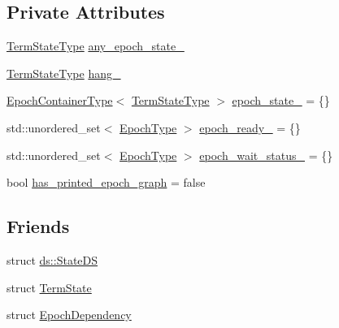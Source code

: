 \subsection*{Private Attributes}
\begin{DoxyCompactItemize}
\item 
\hyperlink{structvt_1_1term_1_1_term_action_ae4c635b69751d887666814700ed64d65}{Term\+State\+Type} \hyperlink{structvt_1_1term_1_1_termination_detector_a49337963d174e5be73fcf467304428a6}{any\+\_\+epoch\+\_\+state\+\_\+}
\item 
\hyperlink{structvt_1_1term_1_1_term_action_ae4c635b69751d887666814700ed64d65}{Term\+State\+Type} \hyperlink{structvt_1_1term_1_1_termination_detector_a5f873fb4a66c8364ec7859bbc608fe55}{hang\+\_\+}
\item 
\hyperlink{structvt_1_1term_1_1_termination_detector_a69e2615b61e072977463eea5b20b7933}{Epoch\+Container\+Type}$<$ \hyperlink{structvt_1_1term_1_1_term_action_ae4c635b69751d887666814700ed64d65}{Term\+State\+Type} $>$ \hyperlink{structvt_1_1term_1_1_termination_detector_a0c55ef5345253002f9de6e5c4337c53a}{epoch\+\_\+state\+\_\+} = \{\}
\item 
std\+::unordered\+\_\+set$<$ \hyperlink{namespacevt_a985a5adf291c34a3ca263b3378388236}{Epoch\+Type} $>$ \hyperlink{structvt_1_1term_1_1_termination_detector_a22c7c6cc9c6cd48b5570dbae226a56f3}{epoch\+\_\+ready\+\_\+} = \{\}
\item 
std\+::unordered\+\_\+set$<$ \hyperlink{namespacevt_a985a5adf291c34a3ca263b3378388236}{Epoch\+Type} $>$ \hyperlink{structvt_1_1term_1_1_termination_detector_a95cdb85a87fcf162725bc6515b43a002}{epoch\+\_\+wait\+\_\+status\+\_\+} = \{\}
\item 
bool \hyperlink{structvt_1_1term_1_1_termination_detector_a68afeac40869ccc50882f717106b382f}{has\+\_\+printed\+\_\+epoch\+\_\+graph} = false
\end{DoxyCompactItemize}
\subsection*{Friends}
\begin{DoxyCompactItemize}
\item 
struct \hyperlink{structvt_1_1term_1_1_termination_detector_a9c0b991de134b4bc5bebf051bd067b9f}{ds\+::\+State\+DS}
\item 
struct \hyperlink{structvt_1_1term_1_1_termination_detector_a628421bb882cfbd05876660b5b7dc150}{Term\+State}
\item 
struct \hyperlink{structvt_1_1term_1_1_termination_detector_aee175d34803c93c65e4323ab28f04088}{Epoch\+Dependency}
\end{DoxyCompactItemize}
